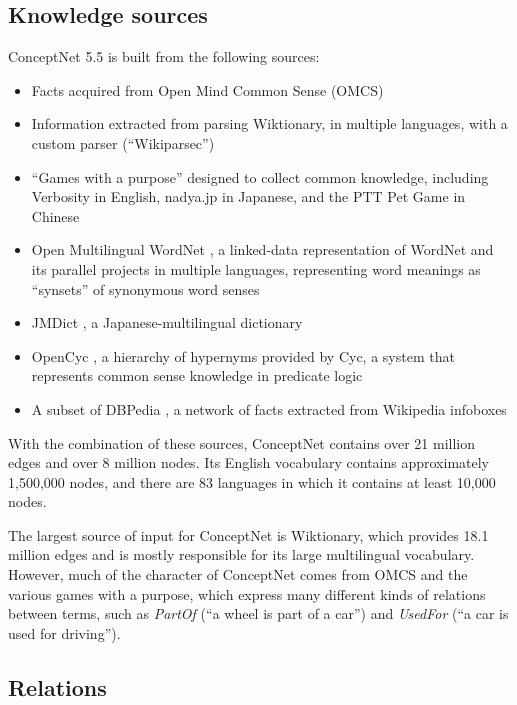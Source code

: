 \documentclass[letterpaper]{article}
\begin{document}
\subsection{Knowledge sources}\label{knowledge-sources}

ConceptNet 5.5 is built from the following sources:

\begin{itemize}
\item
  Facts acquired from Open Mind Common Sense (OMCS) \cite{singh2002omcs}
\item
  Information extracted from parsing Wiktionary, in multiple languages,
  with a custom parser (``Wikiparsec'')
\item
  ``Games with a purpose'' designed to collect common knowledge,
  including Verbosity \cite{vonahn2006verbosity} in English, nadya.jp
  \cite{nakahara2011nadya} in Japanese, and the PTT Pet Game
  \cite{kuo2009petgame} in Chinese
\item
  Open Multilingual WordNet \cite{bond2013linking}, a linked-data
  representation of WordNet \cite{miller1998wordnet} and its parallel
  projects in multiple languages, representing word meanings as
  ``synsets'' of synonymous word senses
\item
  JMDict \cite{breen2004jmdict}, a Japanese-multilingual dictionary
\item
  OpenCyc \cite{matuszek2006cyc}, a hierarchy of hypernyms provided by
  Cyc, a system that represents common sense knowledge in predicate
  logic
\item
  A subset of DBPedia \cite{auer2007dbpedia}, a network of facts
  extracted from Wikipedia infoboxes
\end{itemize}

With the combination of these sources, ConceptNet contains over 21
million edges and over 8 million nodes. Its English vocabulary contains
approximately 1,500,000 nodes, and there are 83 languages in which it
contains at least 10,000 nodes.

The largest source of input for ConceptNet is Wiktionary, which provides
18.1 million edges and is mostly responsible for its large multilingual
vocabulary. However, much of the character of ConceptNet comes from OMCS
and the various games with a purpose, which express many different kinds
of relations between terms, such as \emph{PartOf} (``a wheel is part of
a car'') and \emph{UsedFor} (``a car is used for driving'').


\subsection{Relations}\label{relations}
\end{document}
